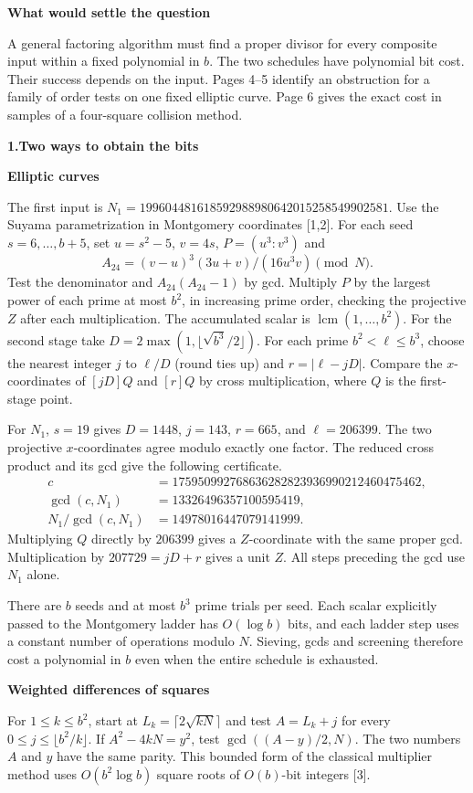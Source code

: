 \documentclass[12pt,letterpaper]{article}
\newcommand{\sect}[1]{{\large\sffamily\bfseries\color{ink}#1}\par}
\newcommand{\subh}[1]{{\sffamily\bfseries\color{accent}#1}\par}
\newcommand{\rs}[1]{\textup{[#1]}}
\begin{document}
\subh{What would settle the question}
A general factoring algorithm must find a proper divisor for every composite input within a fixed polynomial in $b$. The two schedules have polynomial bit cost. Their success depends on the input. Pages 4--5 identify an obstruction for a family of order tests on one fixed elliptic curve. Page 6 gives the exact cost in samples of a four-square collision method.
\newpage

\sect{1.\quad Two ways to obtain the bits}
\subh{Elliptic curves}
The first input is $N_1=199604481618592988980642015258549902581$. Use the Suyama parametrization in Montgomery coordinates \rs{1,2}. For each seed $s=6,\ldots,b+5$, set $u=s^2-5$, $v=4s$, $P=(u^3:v^3)$ and
\[
 A_{24}=(v-u)^3(3u+v)/(16u^3v) \pmod{N}.
\]
Test the denominator and $A_{24}(A_{24}-1)$ by gcd. Multiply $P$ by the largest power of each prime at most $b^2$, in increasing prime order, checking the projective $Z$ after each multiplication. The accumulated scalar is $\operatorname{lcm}(1,\ldots,b^2)$. For the second stage take $D=2\max(1,\lfloor\sqrt{b^3}/2\rfloor)$. For each prime $b^2<\ell\le b^3$, choose the nearest integer $j$ to $\ell/D$ (round ties up) and $r=|\ell-jD|$. Compare the $x$-coordinates of $[jD]Q$ and $[r]Q$ by cross multiplication, where $Q$ is the first-stage point.

For $N_1$, $s=19$ gives $D=1448$, $j=143$, $r=665$, and $\ell=206399$. The two projective $x$-coordinates agree modulo exactly one factor. The reduced cross product and its gcd give the following certificate.
\[
\begin{aligned}
 c&=175950992768636282823936990212460475462,\\
 \gcd(c,N_1)&=13326496357100595419,\\
 N_1/\gcd(c,N_1)&=14978016447079141999 .
\end{aligned}
\]
Multiplying $Q$ directly by $206399$ gives a $Z$-coordinate with the same proper gcd. Multiplication by $207729=jD+r$ gives a unit $Z$. All steps preceding the gcd use $N_1$ alone.

There are $b$ seeds and at most $b^3$ prime trials per seed. Each scalar explicitly passed to the Montgomery ladder has $O(\log b)$ bits, and each ladder step uses a constant number of operations modulo $N$. Sieving, gcds and screening therefore cost a polynomial in $b$ even when the entire schedule is exhausted.

\subh{Weighted differences of squares}
For $1\le k\le b^2$, start at $L_k=\lceil2\sqrt{kN}\rceil$ and test $A=L_k+j$ for every $0\le j\le\lfloor b^2/k\rfloor$. If $A^2-4kN=y^2$, test $\gcd((A-y)/2,N)$. The two numbers $A$ and $y$ have the same parity. This bounded form of the classical multiplier method uses $O(b^2\log b)$ square roots of $O(b)$-bit integers \rs{3}.
\end{document}
